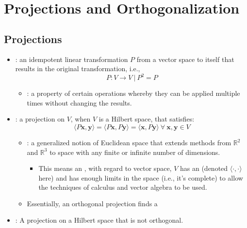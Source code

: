 \chapter{Projections and Orthogonalization}\label{Projections and Orthogonalization}

\section{Projections}\label{Projections}
\begin{itemize}
  \item {}: an idempotent linear transformation \(P\) from a vector space to itself that results in the original transformation, i.e., 
  \[%
  P : V \to V ~|~ P^2 = P
  \]%
    \begin{itemize}
      \item {}: a property of certain operations whereby they can be applied multiple times without changing the results.
    \end{itemize}
  \item {}: a projection on \(V\), when \(V\) is a Hilbert space, that satisfies:
  \[%
  \langle P \bm{x}, \bm{y} \rangle = 
  \langle P \bm{x}, P\bm{y} \rangle =
  \langle \bm{x}, P\bm{y} \rangle~\forall~\bm{x,y} \in V
  \]%
  
    \begin{itemize}
      \item {}: a generalized notion of Euclidean space that extends methods from \(\mathbb{R}^2\) and \(\mathbb{R}^3\) to space with any finite or infinite number of dimensions.
        \begin{itemize}
          \item This means an \hyperref[Vector Length]{}, with regard to vector space,  \(V\) has an \hyperref[The Dot Product]{} (denoted \(\langle \cdot, \cdot \rangle \) here) and has enough limits in the space (i.e., it's complete) to allow the techniques of calculus and vector algebra to be used.
        \end{itemize}
      \item Essentially, an orthogonal projection finds a 
    \end{itemize}
  \item {}: A projection on a Hilbert space that is not orthogonal.
  
\end{itemize}


